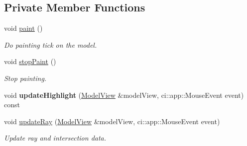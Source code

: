 \subsection*{Private Member Functions}
\begin{DoxyCompactItemize}
\item 
\mbox{\label{classpepr3d_1_1_brush_af5e005149a8d975bcdeebc3432388572}} 
void \mbox{\hyperlink{classpepr3d_1_1_brush_af5e005149a8d975bcdeebc3432388572}{paint}} ()
\begin{DoxyCompactList}\small\item\em Do painting tick on the model. \end{DoxyCompactList}\item 
\mbox{\label{classpepr3d_1_1_brush_af329ad67cb6de39d79e50b6ad61d5de6}} 
void \mbox{\hyperlink{classpepr3d_1_1_brush_af329ad67cb6de39d79e50b6ad61d5de6}{stop\+Paint}} ()
\begin{DoxyCompactList}\small\item\em Stop painting. \end{DoxyCompactList}\item 
\mbox{\label{classpepr3d_1_1_brush_adbf2edca99733e7e94fa119ad0aec9e8}} 
void {\bfseries update\+Highlight} (\mbox{\hyperlink{classpepr3d_1_1_model_view}{Model\+View}} \&model\+View, ci\+::app\+::\+Mouse\+Event event) const
\item 
\mbox{\label{classpepr3d_1_1_brush_acf2324919135ff372d21bd85e686da8c}} 
void \mbox{\hyperlink{classpepr3d_1_1_brush_acf2324919135ff372d21bd85e686da8c}{update\+Ray}} (\mbox{\hyperlink{classpepr3d_1_1_model_view}{Model\+View}} \&model\+View, ci\+::app\+::\+Mouse\+Event event)
\begin{DoxyCompactList}\small\item\em Update ray and intersection data. \end{DoxyCompactList}\end{DoxyCompactItemize}
